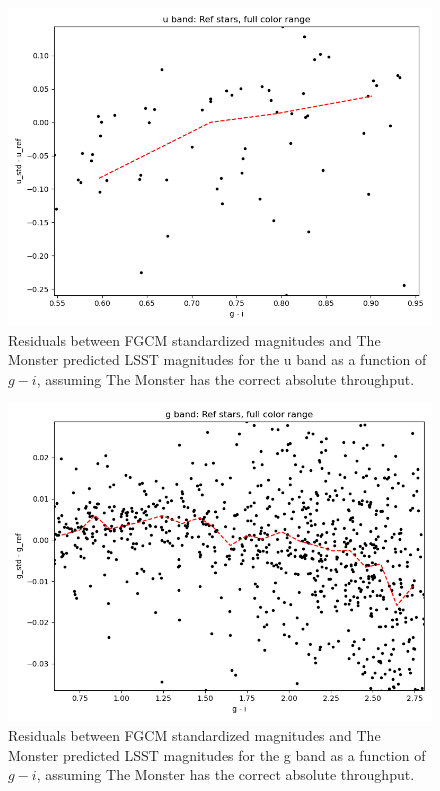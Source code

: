 \begin{figure}
  \includegraphics{photometric_calibration_figures/reference_residuals_u.png}
  \caption{Residuals between FGCM standardized magnitudes and The Monster
    predicted LSST magnitudes for the u band as a function of $g-i$, assuming
    The Monster has the correct absolute throughput.}
\end{figure}

\begin{figure}
  \includegraphics{photometric_calibration_figures/reference_residuals_g.png}
  \caption{Residuals between FGCM standardized magnitudes and The Monster
    predicted LSST magnitudes for the g band as a function of $g-i$, assuming
    The Monster has the correct absolute throughput.}
\end{figure}

